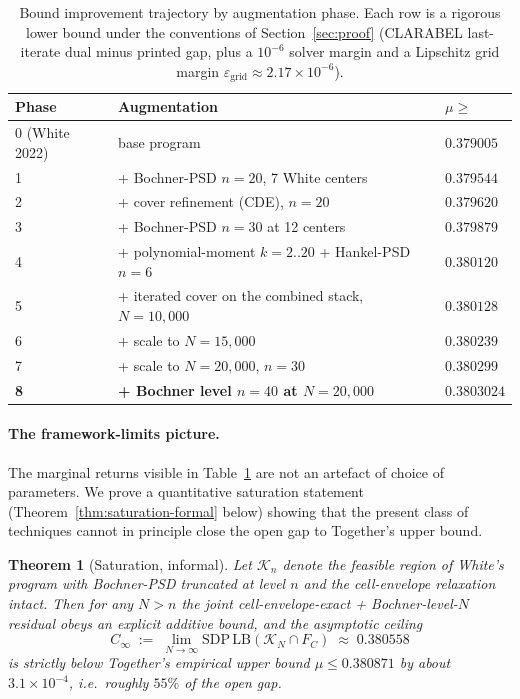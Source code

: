 \documentclass[11pt]{article}
\theoremstyle{plain}
\newtheorem{theorem}{Theorem}
\theoremstyle{definition}
\begin{document}
\begin{table}[h]
\centering
\begin{tabular}{lll}
\toprule
Phase & Augmentation & $\mu \ge$ \\
\midrule
0 (White 2022) & base program & $0.379005$ \\
1 & + Bochner-PSD $n = 20$, 7 White centers & $0.379544$ \\
2 & + cover refinement (CDE), $n = 20$ & $0.379620$ \\
3 & + Bochner-PSD $n = 30$ at 12 centers & $0.379879$ \\
4 & + polynomial-moment $k = 2..20$ + Hankel-PSD $n = 6$ & $0.380120$ \\
5 & + iterated cover on the combined stack, $N = 10{,}000$ & $0.380128$ \\
6 & + scale to $N = 15{,}000$ & $0.380239$ \\
7 & + scale to $N = 20{,}000$, $n = 30$ & $0.380299$ \\
\textbf{8} & \textbf{+ Bochner level $n = 40$ at $N = 20{,}000$} &
$\mathbf{0.3803024}$ \\
\bottomrule
\end{tabular}
\caption{Bound improvement trajectory by augmentation phase. Each row
is a rigorous lower bound under the conventions of
Section~\ref{sec:proof} (CLARABEL last-iterate dual minus printed gap,
plus a $10^{-6}$ solver margin and a Lipschitz grid margin
$\varepsilon_{\text{grid}} \approx 2.17 \times 10^{-6}$).}
\label{tab:trajectory}
\end{table}

\paragraph{The framework-limits picture.}
The marginal returns visible in Table~\ref{tab:trajectory} are not an
artefact of choice of parameters. We prove a quantitative saturation
statement (Theorem~\ref{thm:saturation-formal} below) showing that the
present class of techniques cannot in principle close the open gap to
Together's upper bound.

\begin{theorem}[Saturation, informal]\label{thm:saturation-informal}
Let $\mathcal{K}_n$ denote the feasible region of White's program with
Bochner-PSD truncated at level $n$ and the cell-envelope relaxation
intact. Then for any $N > n$ the joint cell-envelope-exact +
Bochner-level-$N$ residual obeys an explicit additive bound, and the
asymptotic ceiling
\[
C_\infty \;:=\; \lim_{N \to \infty} \mathrm{SDP\,LB}(\mathcal{K}_N \cap
F_C) \;\approx\; 0.380558
\]
is strictly below Together's empirical upper bound $\mu \le 0.380871$
by about $3.1 \times 10^{-4}$, i.e.\ roughly $55\%$ of the open gap.
\end{theorem}
\end{document}
